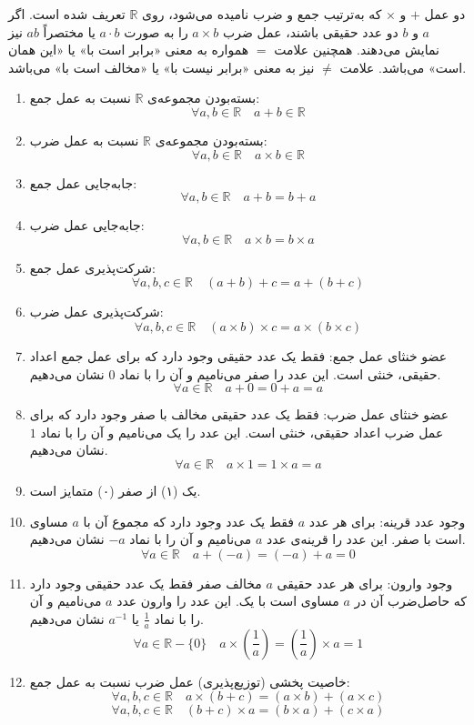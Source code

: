 دو عمل $+$ و
$\times$
که به‌ترتیب جمع و ضرب نامیده می‌شود، روی
$\mathbb{R}$
تعریف شده است. اگر $a$ و $b$ دو عدد حقیقی باشند، عمل ضرب
$a \times b$
را به صورت
$a \cdot b$
یا مختصراً
$ab$
نیز نمایش می‌دهند. همچنین علامت $=$ همواره به معنی «برابر است با» یا «این همان است» می‌باشد. علامت
$\neq$
نیز به معنی «برابر نیست با» یا «مخالف است با» می‌باشد.
\begin{enumerate}
	\item
	بسته‌بودن مجموعه‌ی
	$\mathbb{R}$
	نسبت به عمل جمع:
	$$\forall a,b \in \mathbb{R} \quad a+b \in \mathbb{R}$$
	\item
	بسته‌بودن مجموعه‌ی
	$\mathbb{R}$
	نسبت به عمل ضرب:
	$$\forall a,b \in \mathbb{R} \quad a \times b \in \mathbb{R}$$
	\item 
	جابه‌جایی عمل جمع:
	$$\forall a,b \in \mathbb{R} \quad a+b = b+a$$
	\item 
	جابه‌جایی عمل ضرب:
	$$\forall a,b \in \mathbb{R} \quad a \times b = b \times a$$
	\item 
	شرکت‌پذیری عمل جمع:
	$$\forall a,b,c \in \mathbb{R} \quad (a+b)+c = a+(b+c)$$
	\item 
	شرکت‌پذیری عمل ضرب:
	$$\forall a,b,c \in \mathbb{R} \quad (a \times b) \times c = a \times (b \times c)$$
	\item 
	عضو خنثای عمل جمع: فقط یک عدد حقیقی وجود دارد که برای عمل جمع اعداد حقیقی، خنثی است. این عدد را صفر می‌نامیم و آن را با نماد $0$ نشان می‌دهیم.
	$$\forall a \in \mathbb{R} \quad a+0 = 0+a = a$$
	\item 
	عضو خنثای عمل ضرب: فقط یک عدد حقیقی مخالف با صفر وجود دارد که برای عمل ضرب اعداد حقیقی، خنثی است. این عدد را یک می‌نامیم و آن را با نماد $1$ نشان می‌دهیم.
	$$\forall a \in \mathbb{R} \quad a \times 1 = 1 \times a = a$$
	\item 
	یک (۱) از صفر (۰) متمایز است.
	\item 
	وجود عدد قرینه: برای هر عدد $a$ فقط یک عدد وجود دارد که مجموع آن با $a$ مساوی است با صفر. این عدد را قرینه‌ی عدد $a$ می‌نامیم و آن را با نماد $-a$ نشان می‌دهیم.
	$$\forall a \in \mathbb{R} \quad a+(-a) = (-a)+a = 0$$
	\item 
	وجود وارون: برای هر عدد حقیقی $a$ مخالف صفر فقط یک عدد حقیقی وجود دارد که حاصل‌ضرب آن در $a$ مساوی است با یک. این عدد را وارون عدد $a$ می‌نامیم و آن را با نماد
	$\frac{1}{a}$ یا $a^{-1}$
	نشان می‌دهیم.
	$$\forall a \in \mathbb{R}-\{0\} \quad a \times (\frac{1}{a}) = (\frac{1}{a}) \times a = 1$$
	\item 
	خاصیت پخشی (توزیع‌پذیری) عمل ضرب نسبت به عمل جمع:
	$$\forall a,b,c \in \mathbb{R} \quad a \times (b+c) = (a \times b) + (a \times c)$$
	$$\forall a,b,c \in \mathbb{R} \quad (b+c) \times a = (b \times a) + (c \times a)$$
\end{enumerate}
